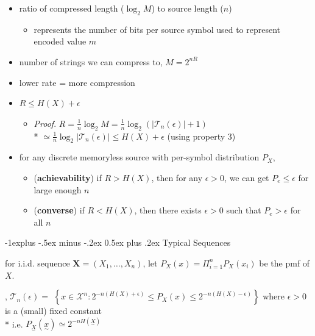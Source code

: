 \documentclass[10pt, landscape]{article}
\makeatletter
\renewcommand{\subsection}{\@startsection{subsection}{2}{0mm}%
  {-1explus -.5ex minus -.2ex}%
  {0.5ex plus .2ex}%
{\normalfont\normalsize\bfseries}}
\makeatother
\begin{document}
\begin{multicols*}{4}
\begin{itemize}
      \begin{itemize}
        \item ratio of compressed length ($\log_2 M$) to source length ($n$)
          \begin{itemize}
            \item represents the number of bits per source symbol used to represent encoded value $m$
          \end{itemize}
        \item number of strings we can compress to, $M = 2^{nR}$
        \item lower rate = more compression
        \item $R \leq H(X) + \epsilon$
          \begin{itemize}
            \item \textit{Proof}. $R = \frac{1}{n}\log_2 M = \frac{1}{n}\log_2 (|\mathcal{T}_n(\epsilon)| + 1)$ 
              \\* $\simeq \frac{1}{n} \log_2 |\mathcal{T}_n(\epsilon)| \leq H(X) + \epsilon$ (using property 3)
          \end{itemize}
      \end{itemize}
  \end{itemize}

  \begin{itemize}
    \item {} for any discrete memoryless source with per-symbol distribution $P_X$, 
      \begin{itemize}
        \item (\textbf{achievability}) if $R>H(X)$, then for any $\epsilon > 0$, we can get $P_e \leq \epsilon$ for large enough $n$ 
        \item (\textbf{converse}) if $R<H(X)$, then there exists $\epsilon > 0$ such that $P_e > \epsilon$ for all $n$
      \end{itemize}
  \end{itemize}

  \subsection{Typical Sequences}

  for i.i.d. sequence $\mathbf{X} = (X_1, \dots, X_n)$, let $P_X(x) = \Pi^n_{i=1} P_X(x_i)$ be the pmf of $X$.

  \begin{center}
    , \( {\displaystyle{ \mathcal{T}_n(\epsilon) = }} \) 
    \( {\displaystyle{ \left\{ x \in \mathcal{X}^n : 2^{-n(H(X) + \epsilon)} \leq P_X(x) \leq 2^{-n(H(X)-\epsilon)} \right\} }} \) 
    where $\epsilon > 0$ is a (small) fixed constant
    \\* i.e. $P_{\underset{\sim}{X}}({\underset{\sim}{x}}) \simeq 2^{-nH({\underset{\sim}{X}})}$
  \end{center}


\end{multicols*}
\end{document}
